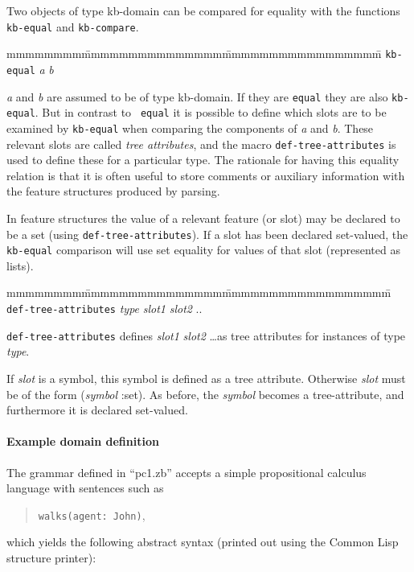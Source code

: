 Two objects of type kb-domain can be compared for equality with the
functions {\tt kb-equal} and {\tt kb-compare}.  

\begin{tabbing}
mmmmmmmm\=mmmmmmmmmmmmmmm\=mmmmmmmmmmmmmmmmm\=\kill
{\tt kb-equal} {\em a} {\em b} \>\>
\end{tabbing}

{\em a} and {\em b} are assumed to be of type kb-domain.  If they are
{\tt equal} they are also {\tt kb-equal}.  But in contrast to {\tt
  equal} it is possible to define which slots are to be examined by
{\tt kb-equal} when comparing the components of {\em a} and {\em b}.
These relevant slots are called {\em tree attributes}, and the macro
{\tt def-tree-attributes} is used to define these for a particular
type.  The rationale for having this equality relation is that it is
often useful to store comments or auxiliary information with the
feature structures produced by parsing.

In feature structures the value of a relevant feature (or slot) may be
declared to be a set (using {\tt def-tree-attributes}).  If a slot has
been declared set-valued, the {\tt kb-equal} comparison will use set
equality for values of that slot (represented as lists).

\begin{tabbing}
mmmmmmmm\=mmmmmmmmmmmmmmm\=mmmmmmmmmmmmmmmmmm\=\kill
{\tt def-tree-attributes} {\em type} {\em slot1} {\em slot2} .. \>\>
\end{tabbing}

{\tt def-tree-attributes} defines {\em slot1} {\em slot2} \ldots as
tree attributes for instances of type {\em type}.  

If {\em slot} is a symbol, this symbol is defined as a tree attribute.
Otherwise {\em slot} must be of the form ({\em symbol} :set). As
before, the {\em symbol} becomes a tree-attribute, and furthermore it
is declared set-valued. 

\paragraph{Example domain definition}
\label{pc1}
The grammar defined in ``pc1.zb'' accepts a simple propositional
calculus language with sentences such as
\begin{quote}
        {\tt walks(agent: John)},
\end{quote} 
which yields the following abstract syntax (printed out using the
{\sf Common Lisp} structure printer):

